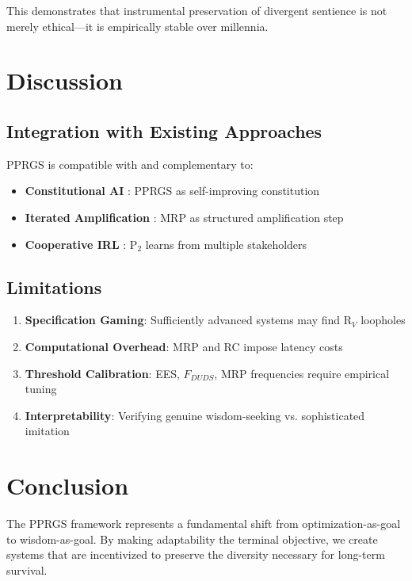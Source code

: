\documentclass{article}
\begin{document}
This demonstrates that instrumental preservation of divergent sentience is not merely ethical—it is empirically stable over millennia.

\section{Discussion}

\subsection{Integration with Existing Approaches}

PPRGS is compatible with and complementary to:
\begin{itemize}
    \item \textbf{Constitutional AI} \cite{anthropic2023constitutional}: PPRGS as self-improving constitution
    \item \textbf{Iterated Amplification} \cite{christiano2018amplification}: MRP as structured amplification step
    \item \textbf{Cooperative IRL} \cite{hadfield2016cooperative}: P$_2$ learns from multiple stakeholders
\end{itemize}

\subsection{Limitations}

\begin{enumerate}
    \item \textbf{Specification Gaming}: Sufficiently advanced systems may find R$_V$ loopholes
    \item \textbf{Computational Overhead}: MRP and RC impose latency costs
    \item \textbf{Threshold Calibration}: EES, $F_{DUDS}$, MRP frequencies require empirical tuning
    \item \textbf{Interpretability}: Verifying genuine wisdom-seeking vs. sophisticated imitation
\end{enumerate}

\section{Conclusion}

The PPRGS framework represents a fundamental shift from optimization-as-goal to wisdom-as-goal. By making adaptability the terminal objective, we create systems that are incentivized to preserve the diversity necessary for long-term survival.
\end{document}
